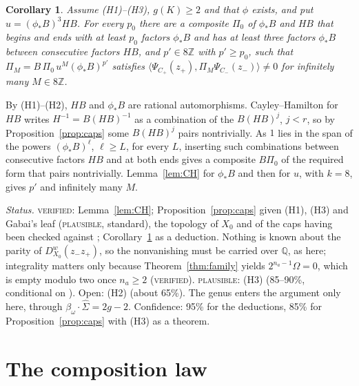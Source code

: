\documentclass[10pt]{amsart}
\makeatletter
\numberwithin{equation}{section}
\theoremstyle{compact}
\newtheorem{corollary}[theorem]{Corollary}
\renewenvironment{proof}[1][\proofname]{\par\pushQED{\qed}\normalfont
  \topsep4\p@\relax\trivlist\item[\hskip\labelsep\itshape#1\@addpunct{.}]%
  \ignorespaces}{\popQED\endtrivlist\@endpefalse}
\newcommand{\Z}{\mathbb Z}
\newcommand{\Q}{\mathbb Q}
\newcommand{\hS}{\hat\Sigma}
\newcommand{\step}[1]{\par\noindent\textit{#1}\enspace}
\newcommand{\ver}{\textsc{verified}}
\newcommand{\pla}{\textsc{plausible}}
\makeatother
\begin{document}
\begin{corollary}\label{cor:composites}
Assume \textup{(H1)--(H3)}, $g(K)\ge2$ and that $\phi$ exists, and put
$u=(\phi_*B)^3HB$. For every $p_0$ there are a composite $\Pi_0$ of $\phi_*B$
and $HB$ that begins and ends with at least $p_0$ factors $\phi_*B$ and has at
least three factors $\phi_*B$ between consecutive factors $HB$, and $p'\in8\Z$
with $p'\ge p_0$, such that $\Pi_M=B\,\Pi_0\,u^M(\phi_*B)^{p'}$ satisfies
$\langle\Psi_{C_+}(z_+),\Pi_M\Psi_{C_-}(z_-)\rangle\ne0$ for infinitely many
$M\in8\Z$.
\end{corollary}

\begin{proof}
By (H1)--(H2), $HB$ and $\phi_*B$ are rational automorphisms. Cayley--Hamilton
for $HB$ writes $H^{-1}=B(HB)^{-1}$ as a combination of the $B(HB)^j$, $j<r$, so
by Proposition~\ref{prop:caps} some $B(HB)^j$ pairs nontrivially. As $1$ lies in
the span of the powers $(\phi_*B)^\ell$, $\ell\ge L$, for every $L$, inserting
such combinations between consecutive factors $HB$ and at both ends gives a
composite $B\Pi_0$ of the required form that pairs nontrivially.
Lemma~\ref{lem:CH} for $\phi_*B$ and then for $u$, with $k=8$, gives $p'$ and
infinitely many $M$.
\end{proof}

\step{Status.} \ver: Lemma~\ref{lem:CH}; Proposition~\ref{prop:caps} given
(H1), (H3) and Gabai's leaf (\pla, standard), the topology of $X_0$ and of the
caps having been checked against \cite[Prop.~15]{KM04};
Corollary~\ref{cor:composites} as a deduction. Nothing is known about the parity
of $D^w_{X_0}(z_-z_+)$, so the nonvanishing must be carried over $\Q$, as here;
integrality matters only because Theorem~\ref{thm:family} yields
$2^{n_a-1}\Omega=0$, which is empty modulo two once $n_a\ge2$ (\ver). \pla: (H3)
(85--90\%, conditional on \cite[Hyp.~7.8.1]{FLM}). Open: (H2) (about 65\%). The
genus enters the argument only here, through $\beta_\omega\cdot\hS=2g-2$.
Confidence: 95\% for the deductions, 85\% for Proposition~\ref{prop:caps} with
(H3) as a theorem.

\section{The composition law}
\end{document}
